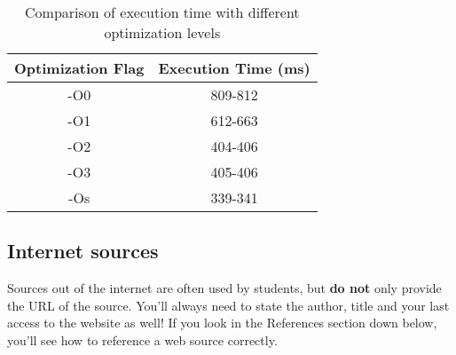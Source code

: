 \documentclass[]{article}
\begin{document}
\begin{table}[h!]
	\centering
	\begin{tabular}{|c|c|}
		\hline
		{\textbf{Optimization Flag}}	&		{\textbf{Execution Time (ms)}} \\
		\hline
		-O0							&		809-812								\\
		\hline
		-O1							&		612-663								\\
		\hline
		-O2							&		404-406								\\
		\hline
		-O3							&		405-406								\\
		\hline
		-Os							&		339-341								\\
		\hline
	\end{tabular}
	\caption{Comparison of execution time with different optimization levels}
	\label{tab:exc_time}
\end{table}


\subsection{Internet sources}
Sources out of the internet are often used by students, but \textbf{do not} only provide the URL of the source. You'll always need to state the author, title and your last access to the website as well! If you look in the References section down below, you'll see how to reference a web source correctly. 


\printbibliography
\end{document}
